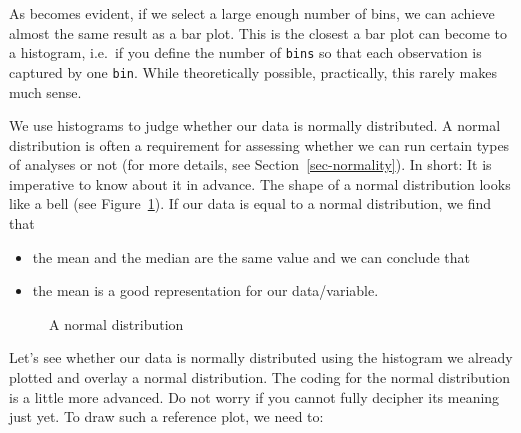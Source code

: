 \documentclass[
  letterpaper,
]{krantz}
\begin{document}
As becomes evident, if we select a large enough number of bins, we can
achieve almost the same result as a bar plot. This is the closest a bar
plot can become to a histogram, i.e.~if you define the number of
\texttt{bins} so that each observation is captured by one \texttt{bin}.
While theoretically possible, practically, this rarely makes much sense.

We use histograms to judge whether our data is normally distributed. A
normal distribution is often a requirement for assessing whether we can
run certain types of analyses or not (for more details, see
Section~\ref{sec-normality}). In short: It is imperative to know about
it in advance. The shape of a normal distribution looks like a bell (see
Figure~\ref{fig-normal-distribution}). If our data is equal to a normal
distribution, we find that

\begin{itemize}
\item
  the mean and the median are the same value and we can conclude that
\item
  the mean is a good representation for our data/variable.
\end{itemize}

\begin{figure}


\caption{\label{fig-normal-distribution}A normal distribution}

\end{figure}%

Let's see whether our data is normally distributed using the histogram
we already plotted and overlay a normal distribution. The coding for the
normal distribution is a little more advanced. Do not worry if you
cannot fully decipher its meaning just yet. To draw such a reference
plot, we need to:
\end{document}
